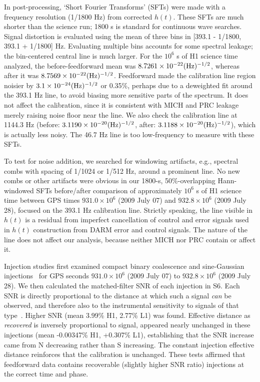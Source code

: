 In post-processing, `Short Fourier Transforms' (SFTs) were made with a frequency resolution (1/1800 Hz) from corrected $h(t)$. These SFTs are much shorter than the science run; 1800 s is standard for continuous wave searches. 
Signal distortion is evaluated using the mean of three bins in [393.1 - 1/1800, 393.1 + 1/1800] Hz.
Evaluating multiple bins accounts for some spectral leakage; the bin-centered central line is much larger. 
For the $10^6$ s of H1 science time analyzed, the before-feedforward mean was $8.7261 \times 10^{-22} (\textup{Hz})^{-1/2}$, whereas after it was $8.7569 \times 10^{-22} (\textup{Hz})^{-1/2}$. Feedforward made the calibration line region noisier by $3.1 \times 10^{-24} (\textup{Hz})^{-1/2}$ or 0.35\%, perhaps due to a deweighted fit around the 393.1 Hz line, to avoid biasing more sensitive parts of the spectrum. It does not affect the calibration, since it is consistent with MICH and PRC leakage merely raising noise floor near the line. We also check the calibration line at 1144.3 Hz (before: $3.1190 \times 10^{-20} (\textup{Hz})^{-1/2}$, after: $3.1188 \times 10^{-20} (\textup{Hz})^{-1/2}$), which is actually less noisy. The 46.7 Hz line is too low-frequency to measure with these SFTs. 

To test for noise addition, we searched for windowing artifacts, e.g., spectral combs with spacing of 1/1024 or 1/512 Hz, around a prominent line.
No new combs or other artifacts were obvious in our 1800-s, 50\%-overlapping Hann-windowed SFTs before/after comparison of approximately $10^6$ s of H1 science time between GPS times $931.0 \times 10^6$ (2009 July 07) and $932.8 \times 10^6$ (2009 July 28), 
focused on the 393.1 Hz calibration line. Strictly speaking, the line visible in $h(t)$ is a residual from imperfect cancellation of control and error signals used in $h(t)$ construction from DARM error and control signals. The nature of the line does not affect our analysis, because neither MICH nor PRC contain or affect it.

Injection studies first examined compact binary coalescence and sine-Gaussian injections~\cite{LIGOBurst2012} for GPS seconds $931.0 \times 10^6$ (2009 July 07) to $932.8 \times 10^6$ (2009 July 28). We then calculated the matched-filter SNR of each injection in S6. Each SNR is directly proportional to the distance at which such a signal \textit{can} be observed, and therefore also to the instrumental sensitivity to signals of that type~\cite{Findchirp2012,PetersMatthews1963}. Higher SNR (mean 3.99\% H1, 2.77\% L1) was found. Effective distance as \textit{recovered} is inversely proportional to signal, appeared nearly unchanged in these injections (mean -0.00347\% H1, +0.307\% L1), establishing that the SNR increase came from N decreasing rather than S increasing. The constant injection effective distance reinforces that the calibration is unchanged. These tests affirmed that feedforward data contains recoverable (slightly higher SNR ratio) injections at the correct time and phase. 

